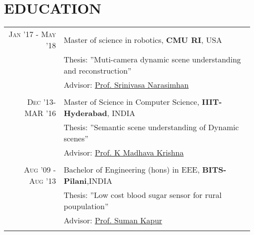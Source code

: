 \documentclass[a4paper,10pt]{article}
\begin{document}
\section{EDUCATION}
\begin{tabular}{rl}	
 \textsc{Jan '17 - May '18}  & Master of science in robotics, {\bf CMU RI}, USA \\
& Thesis: ''Muti-camera dynamic scene understanding and reconstruction'' \\
 
 & 
\normalsize \small Advisor: \href{http://www.cs.cmu.edu/~srinivas/} {Prof. Srinivasa Narasimhan} \\
 
  \vspace{-2 mm}
&\\


 \textsc{Dec} '13- {MAR} '16 & Master of Science in Computer Science, \textbf{IIIT-Hyderabad}, INDIA\\
& Thesis: ''Semantic scene understanding of Dynamic scenes'' \\
& 
\normalsize  \small Advisor: \href{https://www.iiit.ac.in/people/faculty/mkrishna/} {Prof. K Madhava Krishna} \\

 \vspace{-2 mm}
&\\

\textsc{Aug} '09 - \textsc{Aug} '13 & Bachelor of Engineering (hons) in \textsc{EEE}, \normalsize\textbf{BITS-Pilani},INDIA\\
& Thesis: ''Low cost blood sugar sensor for rural poupulation'' \\
& 
\normalsize \small Advisor: 
\href{http://www.bits-pilani.ac.in/Hyderabad/sumankapur/Profile} {Prof. Suman Kapur }\\

 \vspace{-2 mm}
&\\

\end{tabular}
\end{document}
